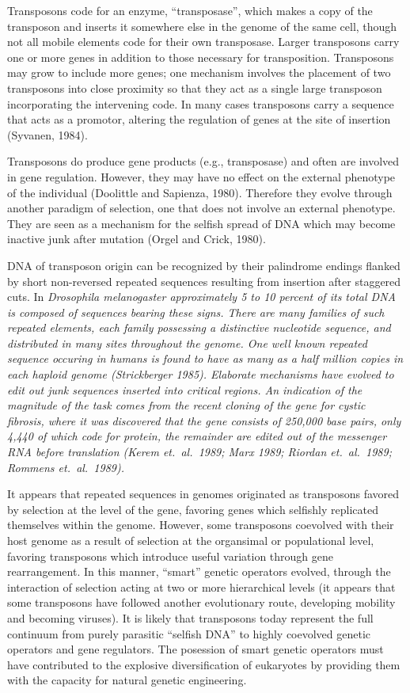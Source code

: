 Transposons code for an enzyme, ``transposase'', which makes a copy
of the transposon and inserts it somewhere else in the genome of the same
cell, though not all mobile elements code for their own transposase.
Larger transposons carry one or more genes in addition to those necessary
for transposition.  Transposons may grow to include more genes; one
mechanism involves the placement of two transposons into close proximity
so that they act as a single large transposon incorporating the intervening
code.  In many cases transposons carry a sequence that acts as a promotor,
altering the regulation of genes at the site of insertion (Syvanen, 1984).

Transposons do produce gene products (e.g., transposase) and often are
involved in gene regulation.  However, they may have no effect on
the external phenotype of the individual (Doolittle and Sapienza, 1980).
Therefore they evolve through another paradigm of selection, one that
does not involve an external phenotype.  They are seen as a mechanism
for the selfish spread of DNA which may become inactive junk after mutation
(Orgel and Crick, 1980).

DNA of transposon origin can be recognized
by their palindrome endings flanked by short non-reversed repeated sequences
resulting from insertion after staggered cuts.  In \it Drosophila
melanogaster \rm approximately 5 to 10 percent of its total DNA is composed
of sequences bearing these signs.  There are many families of such
repeated elements, each family possessing a distinctive nucleotide
sequence, and distributed in many sites throughout the genome.  One well
known repeated sequence occuring in humans is found to have as many as
a half million copies in each haploid genome (Strickberger 1985).
Elaborate mechanisms have evolved to edit out junk sequences inserted
into critical regions.  An indication of the magnitude of the task comes
from the recent cloning of the gene for cystic fibrosis, where it was
discovered that the gene consists of 250,000 base pairs, only 4,440 of
which code for protein, the remainder are edited out of the messenger RNA
before translation (Kerem et.\ al.\ 1989; Marx 1989; Riordan et.\ al.\ 1989;
Rommens et.\ al.\ 1989).

It appears that repeated sequences in genomes originated as transposons
favored by selection at the level of the gene, favoring genes which
selfishly replicated themselves within the genome.  However, some transposons
coevolved with their host genome as a result of selection at the organsimal
or populational level, favoring transposons which introduce useful variation
through gene rearrangement.  In this manner, ``smart'' genetic operators
evolved, through the interaction of selection acting at two or more
hierarchical levels (it appears that some transposons have followed another
evolutionary route, developing mobility and becoming viruses).
It is likely that transposons today represent the
full continuum from purely parasitic ``selfish DNA'' to highly coevolved
genetic operators and gene regulators.  The posession of smart genetic
operators must have contributed to the explosive diversification of
eukaryotes by providing them with the capacity for natural genetic
engineering.

